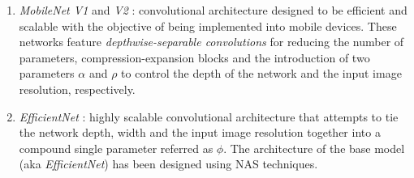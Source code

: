 \begin{enumerate}
   	\item \textit{MobileNet V1} and \textit{V2} \autocite{howard2017, sandler2018}: convolutional architecture designed to be efficient and scalable with the objective of being implemented into mobile devices. These networks feature \textit{depthwise-separable convolutions} for reducing the number of parameters, compression-expansion blocks and the introduction of two parameters $\alpha$ and $\rho$ to control the depth of the network and the input image resolution, respectively.
   	\item \textit{EfficientNet} \autocite{tan2019}: highly scalable convolutional architecture that attempts to tie the network depth, width and the input image resolution  together into a compound single parameter referred as $\phi$. The architecture of the base model (aka \textit{EfficientNet}) has been designed using NAS techniques.
\end{enumerate}


